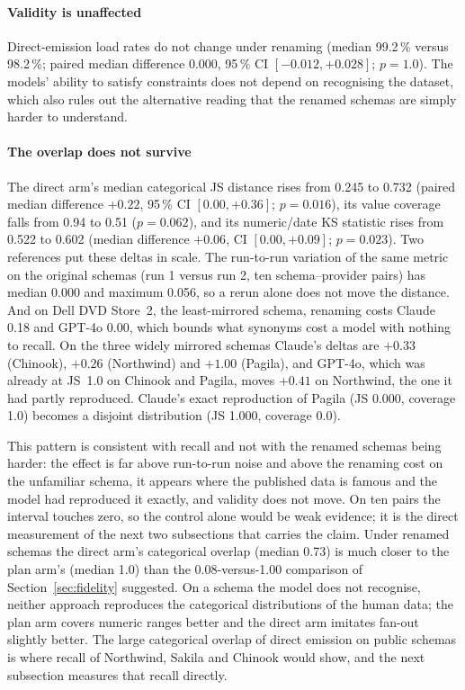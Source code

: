 \documentclass[preprint,12pt]{elsarticle}
\begin{document}
\paragraph{Validity is unaffected} Direct-emission load rates do not change under renaming (median 99.2\,\% versus 98.2\,\%; paired median difference 0.000, 95\,\% CI $[-0.012, +0.028]$; $p=1.0$). The models' ability to satisfy constraints does not depend on recognising the dataset, which also rules out the alternative reading that the renamed schemas are simply harder to understand.

\paragraph{The overlap does not survive} The direct arm's median categorical JS distance rises from 0.245 to 0.732 (paired median difference $+0.22$, 95\,\% CI $[0.00, +0.36]$; $p=0.016$), its value coverage falls from 0.94 to 0.51 ($p=0.062$), and its numeric/date KS statistic rises from 0.522 to 0.602 (median difference $+0.06$, CI $[0.00, +0.09]$; $p=0.023$). Two references put these deltas in scale. The run-to-run variation of the same metric on the original schemas (run 1 versus run 2, ten schema--provider pairs) has median 0.000 and maximum 0.056, so a rerun alone does not move the distance. And on Dell DVD Store~2, the least-mirrored schema, renaming costs Claude 0.18 and GPT-4o 0.00, which bounds what synonyms cost a model with nothing to recall. On the three widely mirrored schemas Claude's deltas are $+0.33$ (Chinook), $+0.26$ (Northwind) and $+1.00$ (Pagila), and GPT-4o, which was already at JS~1.0 on Chinook and Pagila, moves $+0.41$ on Northwind, the one it had partly reproduced. Claude's exact reproduction of Pagila (JS 0.000, coverage 1.0) becomes a disjoint distribution (JS 1.000, coverage 0.0).

This pattern is consistent with recall and not with the renamed schemas being harder: the effect is far above run-to-run noise and above the renaming cost on the unfamiliar schema, it appears where the published data is famous and the model had reproduced it exactly, and validity does not move. On ten pairs the interval touches zero, so the control alone would be weak evidence; it is the direct measurement of the next two subsections that carries the claim. Under renamed schemas the direct arm's categorical overlap (median 0.73) is much closer to the plan arm's (median 1.0) than the 0.08-versus-1.00 comparison of Section~\ref{sec:fidelity} suggested. On a schema the model does not recognise, neither approach reproduces the categorical distributions of the human data; the plan arm covers numeric ranges better and the direct arm imitates fan-out slightly better. The large categorical overlap of direct emission on public schemas is where recall of Northwind, Sakila and Chinook would show, and the next subsection measures that recall directly.
\end{document}

